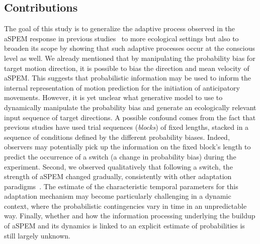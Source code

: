 \documentclass[12pt,english]{article}%
\newcommand{\citep}[1]{\parencite{#1}}
\newcommand{\seeSec}[1]{Section~\ref{sec:#1}}
\begin{document}
\subsection{Contributions}%
The goal of this study is to generalize the adaptive process
observed in the aSPEM response in previous studies~\citep{Montagnini2010,SantosKowler2017} to more ecological settings but
also to broaden its scope by showing that such adaptive processes
occur at the conscious level as well.
We already mentioned that by manipulating the probability bias for target motion direction,
it is possible to bias the direction and mean velocity of aSPEM.
This suggests that probabilistic information may be used
to inform the internal representation of motion prediction
for the initiation of anticipatory movements.
However, it is yet unclear what generative model to use
to dynamically manipulate the probability bias
and generate an ecologically relevant input sequence of target directions.
A possible confound comes from the fact that
previous studies have used trial sequences (\textit{blocks}) of fixed lengths,
stacked in a sequence of conditions defined by the different probability biases.
Indeed, observers may potentially pick up
the information on the fixed block's length
to predict the occurrence of a switch (a change in probability bias) during the experiment.
Second, we observed qualitatively that following a switch,
the strength of aSPEM changed gradually,
consistently with other adaptation paradigms~\citep{Fukushima1996,Kahlon1996,Souto13}.
The estimate of the characteristic temporal parameters for this  adaptation mechanism
may become particularly challenging in a dynamic context,
where the probabilistic contingencies vary in time in an unpredictable way.
Finally, whether and how the information processing underlying
the buildup of aSPEM and its dynamics is linked to
an explicit estimate of probabilities is still largely unknown.
\end{document}
